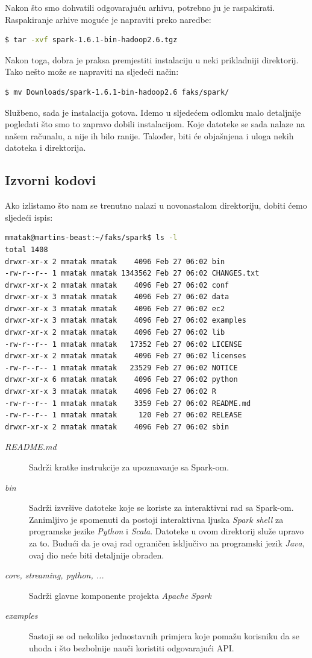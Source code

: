 \documentclass[times, utf8, zavrsni]{fer}
\begin{document}
Nakon što smo dohvatili odgovarajuću arhivu, potrebno ju je raspakirati.\\ Raspakiranje arhive moguće je napraviti preko naredbe:
\begin{lstlisting}[language=bash]
$ tar -xvf spark-1.6.1-bin-hadoop2.6.tgz
\end{lstlisting}
Nakon toga, dobra je praksa premjestiti instalaciju u neki prikladniji direktorij. Tako nešto može se napraviti na sljedeći način:
\begin{lstlisting}[language=bash]
$ mv Downloads/spark-1.6.1-bin-hadoop2.6 faks/spark/
\end{lstlisting}
Službeno, sada je instalacija gotova. Idemo u sljedećem odlomku malo detaljnije pogledati što smo to zapravo dobili instalacijom. Koje datoteke se sada nalaze na našem računalu, a nije ih bilo ranije. Također, biti će objašnjena i uloga nekih datoteka i direktorija.

\subsection{Izvorni kodovi}
Ako izlistamo što nam se trenutno nalazi u novonastalom direktoriju, dobiti ćemo sljedeći ispis:
\begin{lstlisting}[language=bash]
mmatak@martins-beast:~/faks/spark$ ls -l
total 1408
drwxr-xr-x 2 mmatak mmatak    4096 Feb 27 06:02 bin
-rw-r--r-- 1 mmatak mmatak 1343562 Feb 27 06:02 CHANGES.txt
drwxr-xr-x 2 mmatak mmatak    4096 Feb 27 06:02 conf
drwxr-xr-x 3 mmatak mmatak    4096 Feb 27 06:02 data
drwxr-xr-x 3 mmatak mmatak    4096 Feb 27 06:02 ec2
drwxr-xr-x 3 mmatak mmatak    4096 Feb 27 06:02 examples
drwxr-xr-x 2 mmatak mmatak    4096 Feb 27 06:02 lib
-rw-r--r-- 1 mmatak mmatak   17352 Feb 27 06:02 LICENSE
drwxr-xr-x 2 mmatak mmatak    4096 Feb 27 06:02 licenses
-rw-r--r-- 1 mmatak mmatak   23529 Feb 27 06:02 NOTICE
drwxr-xr-x 6 mmatak mmatak    4096 Feb 27 06:02 python
drwxr-xr-x 3 mmatak mmatak    4096 Feb 27 06:02 R
-rw-r--r-- 1 mmatak mmatak    3359 Feb 27 06:02 README.md
-rw-r--r-- 1 mmatak mmatak     120 Feb 27 06:02 RELEASE
drwxr-xr-x 2 mmatak mmatak    4096 Feb 27 06:02 sbin
\end{lstlisting}

\begin{description}
\item[\emph{README.md} ]Sadrži kratke instrukcije za upoznavanje sa Spark-om.
\item[\emph{bin} ]Sadrži izvršive datoteke koje se koriste za interaktivni rad sa Spark-om.\\Zanimljivo je spomenuti da postoji interaktivna ljuska \emph{Spark shell} za programske jezike \emph{Python} i \emph{Scala}. Datoteke u ovom direktorij služe upravo za to. Budući da je ovaj rad ograničen isključivo na programski jezik \emph{Java}, ovaj dio neće biti detaljnije obrađen.
\item[\emph{core, streaming, python, ...} ]Sadrži glavne komponente projekta \emph{Apache Spark} 
\item[\emph{examples} ]Sastoji se od nekoliko jednostavnih primjera koje pomažu korisniku da se uhoda i što bezbolnije nauči koristiti odgovarajući API.
\end{description}
\end{document}
